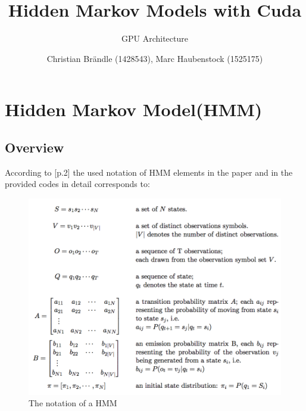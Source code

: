 \documentclass[english, paper=a4]{scrartcl}
\begin{document}
\graphicspath{{images/}}


\title{Hidden Markov Models with Cuda} 

\subtitle{GPU Architecture} 

\author{Christian Brändle (1428543), Marc Haubenstock (1525175)}




\maketitle

\section{Hidden Markov Model(HMM)}

\subsection{Overview}



According to \cite{cuhmm}[p.2] the used notation of HMM elements in the paper and in the provided codes in detail corresponds to:

\begin{figure}[H]
\centering

\includegraphics[scale=0.4]{"symbols"}
  \caption{The notation of a HMM \cite{cuhmm}}
\end{figure}
\end{document}
